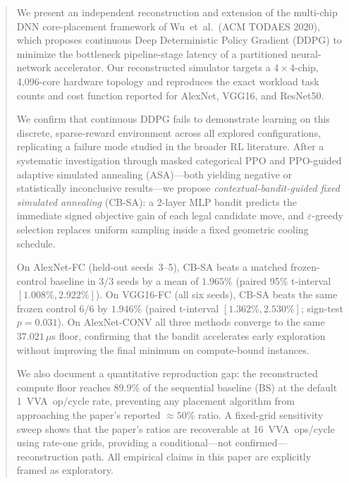 \documentclass[10pt,conference]{IEEEtran}
\begin{document}
\begin{abstract}
We present an independent reconstruction and extension of the multi-chip DNN
core-placement framework of Wu~et~al.\ (ACM TODAES 2020), which proposes
continuous Deep Deterministic Policy Gradient (DDPG) to minimize the
bottleneck pipeline-stage latency of a partitioned neural-network accelerator.
Our reconstructed simulator targets a $4{\times}4$-chip, 4,096-core hardware
topology and reproduces the exact workload task counts and cost function
reported for AlexNet, VGG16, and ResNet50.

We confirm that continuous DDPG fails to demonstrate learning on this
discrete, sparse-reward environment across all explored configurations,
replicating a failure mode studied in the broader RL literature.  After a
systematic investigation through masked categorical PPO and PPO-guided adaptive
simulated annealing (ASA)—both yielding negative or statistically inconclusive
results—we propose \emph{contextual-bandit-guided fixed simulated annealing}
(CB-SA): a 2-layer MLP bandit predicts the immediate signed objective gain of
each legal candidate move, and $\varepsilon$-greedy selection replaces
uniform sampling inside a fixed geometric cooling schedule.

On AlexNet-FC (held-out seeds~3--5), CB-SA beats a matched frozen-control
baseline in 3/3 seeds by a mean of $1.965\%$ (paired 95\% t-interval
$[1.008\%, 2.922\%]$).  On VGG16-FC (all six seeds), CB-SA beats the same
frozen control 6/6 by $1.946\%$ (paired t-interval $[1.362\%, 2.530\%]$;
sign-test $p = 0.031$).  On AlexNet-CONV all three methods converge to the same
$37.021\,\mu$s floor, confirming that the bandit accelerates early exploration
without improving the final minimum on compute-bound instances.

We also document a quantitative reproduction gap: the reconstructed
compute floor reaches $89.9\%$ of the sequential baseline (BS) at the default
1~VVA~op/cycle rate, preventing any placement algorithm from approaching the
paper's reported ${\approx}50\%$ ratio.  A fixed-grid sensitivity sweep shows
that the paper's ratios are recoverable at 16~VVA~ops/cycle using rate-one
grids, providing a conditional---not confirmed---reconstruction path.  All
empirical claims in this paper are explicitly framed as exploratory.
\end{abstract}
\end{document}
